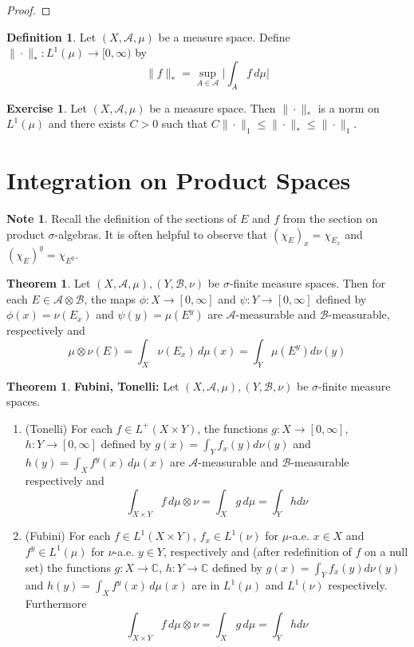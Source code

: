 \documentclass{book}
\theoremstyle{definition}
\newtheorem{defn}[definition]{Definition}
\newtheorem{note}[definition]{Note}
\newtheorem{thm}[definition]{Theorem}
\newtheorem{ex}[definition]{Exercise}
\newcommand{\sig}{\sigma}
\newcommand{\C}{\mathbb{C}}
\newcommand{\MA}{\mathcal{A}}
\newcommand{\MB}{\mathcal{B}}
\DeclareMathOperator*{\0}{\mbf{0}}
\DeclareMathOperator*{\1}{\mbf{1}}
\newcommand{\RG}{[0,\infty]}
\newcommand{\Rg}{[0,\infty)}
\newcommand{\dmu}{\, d \mu}
\begin{document}
\begin{proof}
	\end{proof}
	
	\begin{defn}
	Let $(X, \MA, \mu)$ be a measure space. Define $\| \cdot \|_*: L^1(\mu) \rightarrow \Rg$ by  
	 $$\| f \|_* = \sup_{A \in \MA} \bigg | \int_A f \dmu \bigg |$$ 
	\end{defn}
	
	\begin{ex}
	Let $(X, \MA, \mu)$ be a measure space. Then $\| \cdot \|_*$ is a norm on $L^1(\mu)$ and there exists $C >0$ such that $C\|\cdot\|_1 \leq \|\cdot\|_* \leq \| \cdot \|_1$.
	\end{ex}
	
	
	
	
	
	
	
	
	
	
	\newpage
	\section{Integration on Product Spaces}
	
	\begin{note}
		Recall the definition of the sections of $E$ and $f$ from the section on product $\sigma$-algebras. It is often helpful to observe that $(\chi_E)_x = \chi_{E_x}$ and $(\chi_E)^y = \chi_{E^y}$.
	\end{note}
	
	\begin{thm}
		Let $(X,\MA, \mu), (Y, \MB, \nu)$ be $\sig$-finite measure spaces. Then for each $E \in \MA \otimes \MB$, the maps $\phi:X \rightarrow \RG$ and $\psi: Y \rightarrow \RG$ defined by $\phi(x) = \nu(E_x)$ and $\psi(y) = \mu(E^y)$ are $\MA$-measurable and $\MB$-measurable, respectively and $$\mu \otimes \nu(E) = \int_X \nu(E_x)\dmu(x) = \int_Y \mu(E^y)d\nu(y)$$ 
	\end{thm}
	
	\begin{thm}\textbf{Fubini, Tonelli:}
		Let $(X,\MA, \mu), (Y, \MB, \nu)$ be $\sig$-finite measure spaces. 
		
		\begin{enumerate}
			\item (Tonelli) For each $f \in L^+(X \times Y)$, the functions $g:X \rightarrow \RG$, $h:Y \rightarrow \RG$ defined by $g(x) = \int_Y f_x(y)d\nu(y)$ and $h(y) = \int_X f^y(x) \dmu(x)$ are $\MA$-measurable and $\MB$-measurable respectively and $$\int_{X \times Y}f \dmu \otimes \nu = \int_X g \dmu = \int_Y h d\nu$$
			
			\item (Fubini) For each $f \in L^1(X \times Y)$, $f_x \in L^1(\nu)$ for $\mu$-a.e. $x \in X$ and $f^y \in L^1(\mu)$ for $\nu$-a.e. $y \in Y$, respectively and (after redefinition of $f$ on a null set) the functions $g:X \rightarrow \C$, $h:Y \rightarrow \C$ defined by $g(x) = \int_Y f_x(y)d\nu(y)$ and $h(y) = \int_X f^y(x) \dmu(x)$ are in $L^1(\mu)$ and $L^1(\nu)$ respectively. Furthermore 
			$$\int_{X \times Y}f \, d \mu \otimes \nu = \int_X g \dmu = \int_Y h d\nu$$
		\end{enumerate}
	\end{thm}
	
\end{document}
